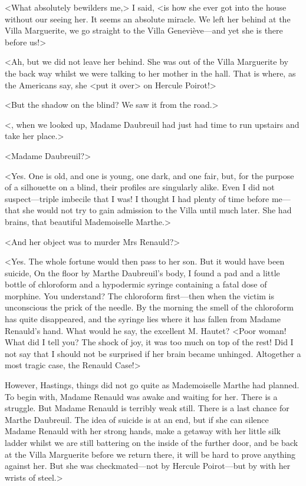 <What absolutely bewilders me,> I said, <is how she ever got into the house without our seeing her. It seems an absolute miracle. We left her behind at the Villa Marguerite, we go straight to the Villa Geneviève—and yet she is there before us!> 

 <Ah, but we did not leave her behind. She was out of the Villa Marguerite by the back way whilst we were talking to her mother in the hall. That is where, as the Americans say, she <put it over> on Hercule Poirot!> 

 <But the shadow on the blind? We saw it from the road.> 

 <, when we looked up, Madame Daubreuil had just had time to run upstairs and take her place.> 

 <Madame Daubreuil?> 

 <Yes. One is old, and one is young, one dark, and one fair, but, for the purpose of a silhouette on a blind, their profiles are singularly alike. Even I did not suspect—triple imbecile that I was! I thought I had plenty of time before me—that she would not try to gain admission to the Villa until much later. She had brains, that beautiful Mademoiselle Marthe.> 

 <And her object was to murder Mrs Renauld?> 

<Yes. The whole fortune would then pass to her son. But it would have been suicide,  On the floor by Marthe Daubreuil's body, I found a pad and a little bottle of chloroform and a hypodermic syringe containing a fatal dose of morphine. You understand? The chloroform first—then when the victim is unconscious the prick of the needle. By the morning the smell of the chloroform has quite disappeared, and the syringe lies where it has fallen from Madame Renauld's hand. What would he say, the excellent M. Hautet? <Poor woman! What did I tell you? The shock of joy, it was too much on top of the rest! Did I not say that I should not be surprised if her brain became unhinged. Altogether a most tragic case, the Renauld Case!> 

However, Hastings, things did not go quite as Mademoiselle Marthe had planned. To begin with, Madame Renauld was awake and waiting for her. There is a struggle. But Madame Renauld is terribly weak still. There is a last chance for Marthe Daubreuil. The idea of suicide is at an end, but if she can silence Madame Renauld with her strong hands, make a getaway with her little silk ladder whilst we are still battering on the inside of the further door, and be back at the Villa Marguerite before we return there, it will be hard to prove anything against her. But she was checkmated—not by Hercule Poirot—but by  with her wrists of steel.> 

